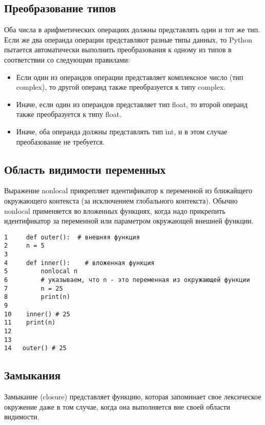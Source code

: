 \documentclass[12pt, a4paper]{article}
\begin{document}
\subsection{Преобразование типов}

Оба числа в арифметических операциях должны представлять один и тот же тип. Если же два операнда операции представляют разные типы данных, то Python пытается автоматически выполнить преобразования к одному из типов в соответствии со следующми правилами:

\begin{itemize}
    \item Если один из операндов операции представляет комплексное число (тип complex), то другой операнд также преобразуется к типу complex.
    \item Иначе, если один из операндов представляет тип float, то второй операнд также преобразуется к типу float.
    \item Иначе, оба операнда должны представлять тип int, и в этом случае преобазование не требуется.
\end{itemize}
    
\subsection{Область видимости переменных}

Выражение nonlocal прикрепляет идентификатор к переменной из ближайщего окружающего контекста (за исключением глобального контекста). Обычно nonlocal применяется во вложенных функциях, когда надо прикрепить идентификатор за переменной или параметром окружающей внешней функции.

\newpage

\begin{verbatim}
1     def outer():  # внешняя функция
2     n = 5
3  
4     def inner():    # вложенная функция
5         nonlocal n  
6         # указываем, что n - это переменная из окружающей функции
7         n = 25
8         print(n)
9  
10    inner() # 25
11    print(n)
12 
13 
14   outer() # 25
\end{verbatim}

\subsection{Замыкания}

Замыкание (closure) представляет функцию, которая запоминает свое лексическое окружение даже в том случае, когда она выполняется вне своей области видимости.
\end{document}
